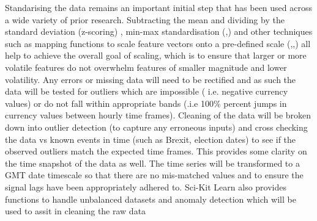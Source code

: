 \documentclass[11pt, a4paper]{article}
\begin{document}
\par Standarising the data remains an important initial step that has been used across a wide variety of prior research. Subtracting the mean and dividing by the standard deviation (z-scoring) \cite{Fischer2018}, min-max standardisation (\cite{Gunduz2017},\cite{Kumar2006})  and other techniques such as  mapping functions to scale feature vectors onto a pre-defined scale (\cite{Kara2011},\cite{Wang2014},\cite{Patel2015}) all help to achieve the overall goal of scaling, which is to ensure that larger or more volatile features do not overwhelm features of smaller magnitude and lower volatility. 
\newline Any errors or missing data will need to be rectified and as such the data will be tested for outliers which are impossible ( i.e. negative currency values) or do not fall within appropriate bands (.i.e 100\% percent jumps in currency values between hourly time frames). Cleaning of the data will be broken down into outlier detection (to capture any erroneous inputs) and cross checking the data vs known events in time (such as Brexit, election dates) to see if the observed outliers match the expected time frames. This provides some clarity on the time snapshot of the data as well. The time series will be transformed to a GMT date timescale so that there are no mis-matched values and to ensure the signal lags have been appropriately adhered to. 
\newline Sci-Kit Learn also provides functions to handle unbalanced datasets and anomaly detection which will be used to assit in cleaning the raw data \cite{anomalydetection} 
\end{document}
